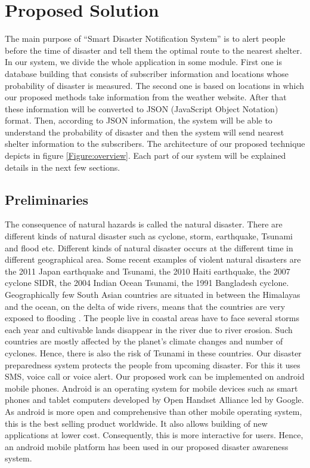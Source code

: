 \documentclass[conference]{IEEEtran}
\begin{document}
\section {Proposed Solution}
\label{sec:problem}

The main purpose of “Smart Disaster Notification System” is to alert people before the time of disaster and tell them the optimal route to the nearest shelter. In our system, we divide the whole application in some module. First one is database building that consists of subscriber information and locations whose probability of disaster is measured. The second one is based on locations in which our proposed methods take information from the weather website. After that these information will be converted to JSON (JavaScript Object Notation) \cite{bray2014javascript} format. Then,  according to JSON information, the system will be able to understand the probability of disaster and then the system will send nearest shelter information to the subscribers. The architecture of our proposed technique depicts in figure \ref{Figure:overview}. Each part of our system will be explained details in the next few sections. 

\subsection{Preliminaries}
\label{preliminaries}

The consequence of natural hazards is called the natural disaster. There are different kinds of natural disaster such as cyclone, storm, earthquake, Tsunami and flood etc. Different kinds of natural disaster occurs at the different time in different geographical area. Some recent examples of violent natural disasters are the 2011 Japan earthquake and Tsunami, the 2010 Haiti earthquake, the 2007 cyclone SIDR, the 2004 Indian Ocean Tsunami, the 1991 Bangladesh cyclone. Geographically few South Asian countries are situated in between the Himalayas and the ocean, on the delta of wide rivers, means that the countries are very exposed to flooding \cite{latif2011openstreetmap}.  The people live in coastal areas have to face several storms each year and cultivable lands disappear in the river due to river erosion. Such countries are mostly affected by the planet’s climate changes and number of cyclones. Hence, there is also the risk of Tsunami in these countries. Our disaster preparedness system protects the people from upcoming disaster. For this it uses SMS, voice call or voice alert. Our proposed work can be implemented on android mobile phones. Android \cite{developers2011android} is an operating system for mobile devices such as smart phones and tablet computers developed by Open Handset Alliance led by Google. As android is more open and comprehensive than other mobile operating system, this is the best selling product worldwide. It also allows building of new applications at lower cost. Consequently, this is more interactive for users. Hence, an android mobile platform has been used in our proposed disaster awareness system.
\end{document}
